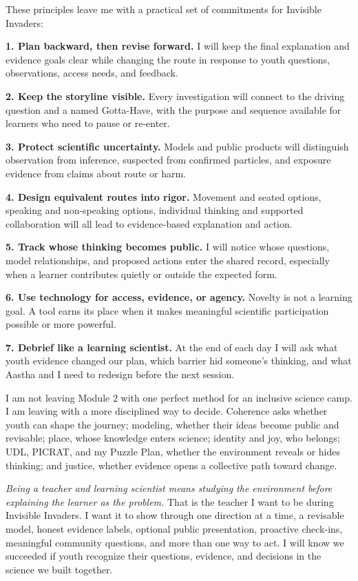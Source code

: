 \documentclass[11pt,letterpaper]{article}
\newcommand{\reviewsection}[1]{\Needspace{5\baselineskip}\vspace{0.07in}\noindent{\normalsize\bfseries\color{PrimaryRed}#1}\par\vspace{0.02in}}
\begin{document}
\reviewsection{My Camp Commitments}

These principles leave me with a practical set of commitments for Invisible Invaders:

\textbf{1. Plan backward, then revise forward.} I will keep the final explanation and evidence goals clear while changing the route in response to youth questions, observations, access needs, and feedback.

\textbf{2. Keep the storyline visible.} Every investigation will connect to the driving question and a named Gotta-Have, with the purpose and sequence available for learners who need to pause or re-enter.

\textbf{3. Protect scientific uncertainty.} Models and public products will distinguish observation from inference, suspected from confirmed particles, and exposure evidence from claims about route or harm.

\textbf{4. Design equivalent routes into rigor.} Movement and seated options, speaking and non-speaking options, individual thinking and supported collaboration will all lead to evidence-based explanation and action.

\textbf{5. Track whose thinking becomes public.} I will notice whose questions, model relationships, and proposed actions enter the shared record, especially when a learner contributes quietly or outside the expected form.

\textbf{6. Use technology for access, evidence, or agency.} Novelty is not a learning goal. A tool earns its place when it makes meaningful scientific participation possible or more powerful.

\textbf{7. Debrief like a learning scientist.} At the end of each day I will ask what youth evidence changed our plan, which barrier hid someone's thinking, and what Aastha and I need to redesign before the next session.

\reviewsection{Closing Reflection}

I am not leaving Module 2 with one perfect method for an inclusive science camp. I am leaving with a more disciplined way to decide. Coherence asks whether youth can shape the journey; modeling, whether their ideas become public and revisable; place, whose knowledge enters science; identity and joy, who belongs; UDL, PICRAT, and my Puzzle Plan, whether the environment reveals or hides thinking; and justice, whether evidence opens a collective path toward change.

\textit{Being a teacher and learning scientist means studying the environment before explaining the learner as the problem.} That is the teacher I want to be during Invisible Invaders. I want it to show through one direction at a time, a revisable model, honest evidence labels, optional public presentation, proactive check-ins, meaningful community questions, and more than one way to act. I will know we succeeded if youth recognize their questions, evidence, and decisions in the science we built together.
\end{document}
